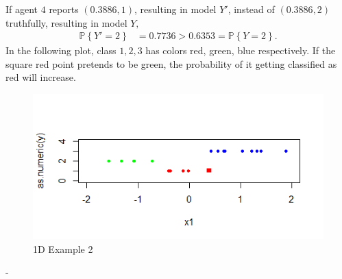 \documentclass{article}
\begin{document}
If agent $4$ reports $\left(0.3886, 1\right)$, resulting in model $Y'$, instead of $\left(0.3886, 2\right)$ truthfully, resulting in model $Y, $
\begin{align*}
\mathbb{P}\left\{Y' = 2\right\} &= 0.7736 > 0.6353 = \mathbb{P}\left\{Y = 2\right\}.
\end{align*}
In the following plot, class $1, 2, 3$ has colors red, green, blue respectively. If the square red point pretends to be green, the probability of it getting classified as red will increase.
\begin{figure}[H]
\centering
\includegraphics[width=0.5\linewidth]{test1d_585}
\caption{1D Example 2}
\end{figure}
 -
\newline \newline
\end{document}
